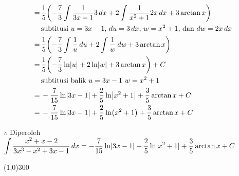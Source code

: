 \begin{enumerate}[leftmargin=*, label={\arabic*}.]
\begin{enumerate}[label={\alph*}.]
\begin{align*}
        =\,&\frac{1}{5}\brk*{-\frac{7}{3}\int\frac{1}{3x-1}3\,dx
        +2\int\frac{1}{x^{2}+1}2x\,dx+3\arctan x}\\
        &\text{subtitusi $u=3x-1$, $du=3\,dx$, $w=x^{2}+1$, dan $dw=2x\,dx$}\\
        =\,&\frac{1}{5}\brk*{-\frac{7}{3}\int\frac{1}{u}\,du
        +2\int\frac{1}{w}\,dw+3\arctan x}\\
        =\,&\frac{1}{5}\brk*{-\frac{7}{3}\ln\abs{u}
        +2\ln\abs{w}+3\arctan x}+C\\
        &\text{subtitusi balik $u=3x-1$ $w=x^{2}+1$}\\
        =\,&-\frac{7}{15}\ln\abs{3x-1}
        +\frac{2}{5}\ln\abs*{x^{2}+1}+\frac{3}{5}\arctan x+C\\
        =\,&-\frac{7}{15}\ln\abs{3x-1}
        +\frac{2}{5}\ln\brk*{x^{2}+1}+\frac{3}{5}\arctan x+C
    \end{align*}

    $\therefore$ Diperoleh $\displaystyle\int \frac{x^{2}+x-2}{3x^{3}-x^{2}+3x-1}\,dx
    =-\frac{7}{15}\ln\lvert3x-1\rvert
    +\frac{2}{5}\ln\lvert x^{2}+1\rvert+\frac{3}{5}\arctan x+C$

    \end{enumerate}
\end{enumerate}

\begin{center}\line(1,0){300}\end{center}
